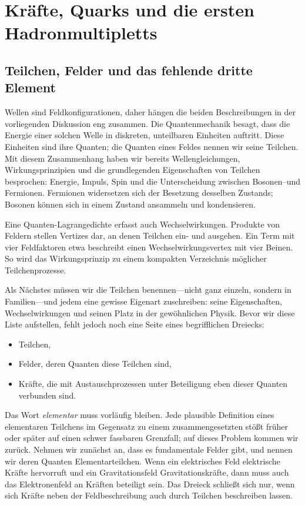 \chapter{Kräfte, Quarks und die ersten Hadronmultipletts}

\section{Teilchen, Felder und das fehlende dritte Element}

Wellen sind Feldkonfigurationen, daher hängen die beiden Beschreibungen in der vorliegenden Diskussion eng zusammen. Die Quantenmechanik besagt, dass die Energie einer solchen Welle in diskreten, unteilbaren Einheiten auftritt. Diese Einheiten sind ihre Quanten; die Quanten eines Feldes nennen wir seine Teilchen. Mit diesem Zusammenhang haben wir bereits Wellengleichungen, Wirkungsprinzipien und die grundlegenden Eigenschaften von Teilchen besprochen: Energie, Impuls, Spin und die Unterscheidung zwischen Bosonen--und Fermionen. Fermionen widersetzen sich der Besetzung desselben Zustands; Bosonen können sich in einem Zustand ansammeln und kondensieren.

Eine Quanten-Lagrangedichte erfasst auch Wechselwirkungen. Produkte von Feldern stellen Vertizes dar, an denen Teilchen ein- und ausgehen. Ein Term mit vier Feldfaktoren etwa beschreibt einen Wechselwirkungsvertex mit vier Beinen. So wird das Wirkungsprinzip zu einem kompakten Verzeichnis möglicher Teilchenprozesse.

Als Nächstes müssen wir die Teilchen benennen---nicht ganz einzeln, sondern in Familien---und jedem eine gewisse Eigenart zuschreiben: seine Eigenschaften, Wechselwirkungen und seinen Platz in der gewöhnlichen Physik. Bevor wir diese Liste aufstellen, fehlt jedoch noch eine Seite eines begrifflichen Dreiecks:
\begin{itemize}
\item Teilchen,
\item Felder, deren Quanten diese Teilchen sind,
\item Kräfte, die mit Austauschprozessen unter Beteiligung eben dieser Quanten verbunden sind.
\end{itemize}

Das Wort \emph{elementar} muss vorläufig bleiben. Jede plausible Definition eines elementaren Teilchens im Gegensatz zu einem zusammengesetzten stößt früher oder später auf einen schwer fassbaren Grenzfall; auf dieses Problem kommen wir zurück. Nehmen wir zunächst an, dass es fundamentale Felder gibt, und nennen wir deren Quanten Elementarteilchen. Wenn ein elektrisches Feld elektrische Kräfte hervorruft und ein Gravitationsfeld Gravitationskräfte, dann muss auch das Elektronenfeld an Kräften beteiligt sein. Das Dreieck schließt sich nur, wenn sich Kräfte neben der Feldbeschreibung auch durch Teilchen beschreiben lassen.


